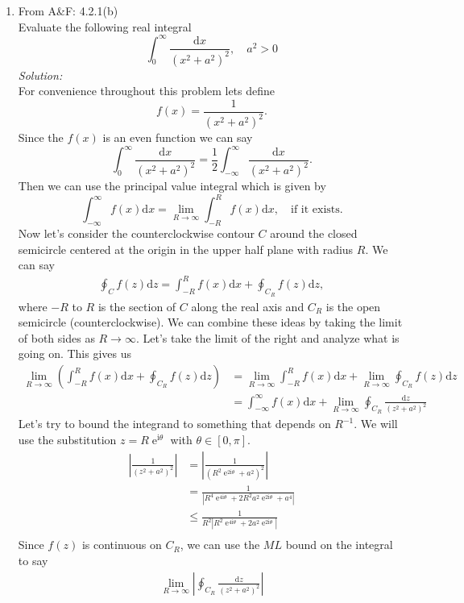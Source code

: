 \documentclass[10pt]{amsart}
\newcommand{\D}{\mathrm{d}}
\newcommand{\I}{\mathrm{i}}
\DeclareMathOperator{\E}{e}
\theoremstyle{nonumberplain}
\begin{document}
\begin{enumerate}[label={\bf {\arabic*}:}]
\item From A\&F: 4.2.1(b)\\
Evaluate the following real integral
$$
\int_0^\infty \frac {\D x}{ (x^2 + a^2)^2 }, \quad a^2 > 0
$$
\textit{Solution:} \\
For convenience throughout this problem lets define
$$f(x) = \frac 1 {(x^2 + a^2)^2}.$$
Since the $f(x)$ is an even function we can say
$$
\int_0^\infty \frac {\D x}{ (x^2 + a^2)^2 } = \frac 1 2 \int_{-\infty}^\infty \frac {\D x}{ (x^2 + a^2)^2 }.
$$
Then we can use the principal value integral which is given by
$$
\int_{-\infty}^{\infty}f(x) \D x = \lim_{R\rightarrow \infty} \int_{-R}^R f(x) \D x, \quad \text{if it exists.}
$$
Now let's consider the counterclockwise contour $C$ around the closed semicircle centered at the origin in the upper half plane with radius $R$.
We can say 
\begin{align}
\oint_C f(z) \D z = \int_{-R}^R f(x) \D x + \oint_{C_R}f(z) \D z,
\label{eq:eq01}
\end{align}
where $-R$ to $R$ is the section of $C$ along the real axis and $C_R$ is the open semicircle (counterclockwise).
We can combine these ideas by taking the limit of both sides as $R\rightarrow \infty$.
Let's take the limit of the right and analyze what is going on.
This gives us
\begin{align*}
\lim_{R\rightarrow \infty} \left(\int_{-R}^R f(x) \D x + \oint_{C_R}f(z) \D z \right)
	&= \lim_{R\rightarrow \infty} \int_{-R}^R f(x) \D x + \lim_{R\rightarrow \infty} \oint_{C_R}f(z) \D z \\
	&= \int_{-\infty}^\infty f(x) \D x + \lim_{R\rightarrow \infty} \oint_{C_R} \frac {\D z}{ (z^2 + a^2)^2 }
\end{align*}
Let's try to bound the integrand to something that depends on $R^{-1}$.
We will use the substitution $z = R\E^{\I\theta}$ with $\theta \in [0, \pi]$.
\begin{align*}
\left| \frac 1 {(z^2 + a^2)^2} \right|
	&= \left| \frac 1 {(R^2\E^{2\I\theta} + a^2)^2} \right| \\
	&= \frac 1 {\left|R^4\E^{4\I\theta} + 2R^2a^2\E^{2\I\theta} + a^4 \right|} \\
	&\leq \frac 1 {R^2\left|R^2\E^{4\I\theta} + 2a^2\E^{2\I\theta} \right|} \\
\end{align*}
Since $f(z)$ is continuous on $C_R$, we can use the $ML$ bound on the integral to say
\begin{align*}
\lim_{R\rightarrow\infty}\left| \oint_{C_R} \frac {\D z}{ (z^2 + a^2)^2 } \right|

\end{align*}
\end{enumerate}
\end{document}
